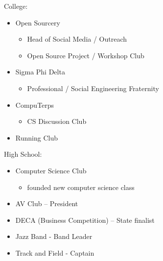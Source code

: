 \documentclass[11pt]{article}
\begin{document}
{\fontsize{10}{12}\robotocondlight
\begin{multicols}{2}
    College: 
    \begin{itemize}[noitemsep,nolistsep]
        \item Open Sourcery
        \begin{itemize}[noitemsep,nolistsep]
            \item Head of Social Media / Outreach
            \item Open Source Project / Workshop Club
        \end{itemize}
        \item Sigma Phi Delta
        \begin{itemize}[noitemsep,nolistsep]
            \item Professional / Social Engineering Fraternity
        \end{itemize}
        \item CompuTerps
        \begin{itemize}[noitemsep,nolistsep]
            \item CS Discussion Club
        \end{itemize}
        \item Running Club
    \end{itemize}
    \columnbreak
    High School:
    \begin{itemize}[noitemsep,nolistsep]
        \item Computer Science Club
        \begin{itemize}[noitemsep,nolistsep]
            \item founded new computer science class
        \end{itemize}
        \item AV Club – President
        \item DECA (Business Competition) – State finalist
        \item Jazz Band - Band Leader
        \item Track and Field - Captain
    \end{itemize}
\end{multicols}
}
\end{document}
